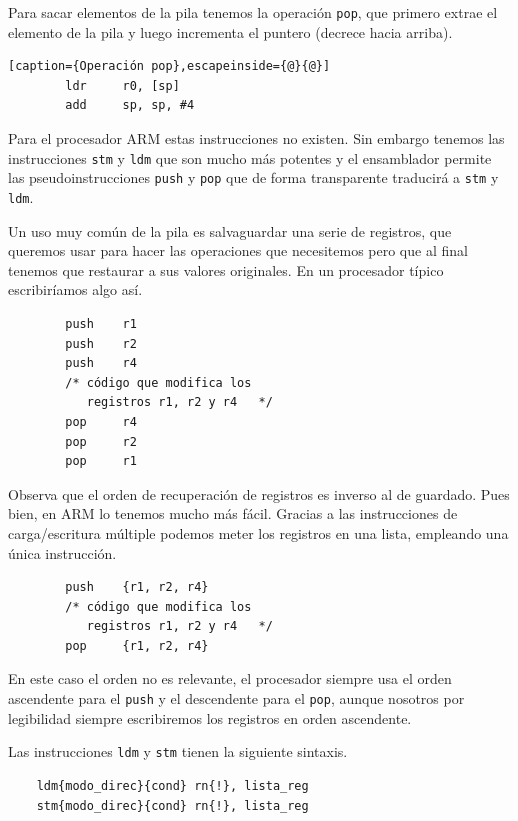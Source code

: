 Para sacar elementos de la pila tenemos la operación {\tt pop}, que primero extrae
el elemento de la pila y luego incrementa el puntero (decrece hacia arriba).

\begin{lstlisting}[caption={Operación pop},escapeinside={@}{@}]
        ldr     r0, [sp]
        add     sp, sp, #4
\end{lstlisting}

Para el procesador ARM estas instrucciones no existen. Sin embargo tenemos las
instrucciones {\tt stm} y {\tt ldm} que son mucho más potentes y el ensamblador
permite las pseudoinstrucciones {\tt push} y {\tt pop} que de forma transparente
traducirá a {\tt stm} y {\tt ldm}.

Un uso muy común de la pila es salvaguardar una serie de registros, que queremos
usar para hacer las operaciones que necesitemos pero que al final tenemos que
restaurar a sus valores originales. En un procesador típico escribiríamos algo así.

\begin{lstlisting}
        push    r1
        push    r2
        push    r4
        /* código que modifica los
           registros r1, r2 y r4   */
        pop     r4
        pop     r2
        pop     r1
\end{lstlisting}

Observa que el orden de recuperación de registros es inverso al de guardado. Pues
bien, en ARM lo tenemos mucho más fácil. Gracias a las instrucciones de carga/escritura
múltiple podemos meter los registros en una lista, empleando una única instrucción.

\begin{lstlisting}
        push    {r1, r2, r4}
        /* código que modifica los
           registros r1, r2 y r4   */
        pop     {r1, r2, r4}
\end{lstlisting}

En este caso el orden no es relevante, el procesador siempre usa el orden ascendente para
el {\tt push} y el descendente para el {\tt pop}, aunque nosotros por legibilidad siempre
escribiremos los registros en orden ascendente.

Las instrucciones {\tt ldm} y {\tt stm} tienen la siguiente sintaxis.

\begin{lstlisting}
    ldm{modo_direc}{cond} rn{!}, lista_reg
    stm{modo_direc}{cond} rn{!}, lista_reg
\end{lstlisting}

